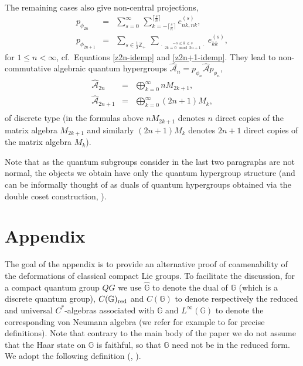\documentclass[12pt]{amsart}
\theoremstyle{definition}
\theoremstyle{remark}
\numberwithin{equation}{section}
\begin{document}
The remaining cases also give non-central projections,
\begin{eqnarray*}
p_{\phi_{2n}} &=& \sum_{s=0}^\infty
\,\sum_{k=-\lceil\frac{s}{n}\rceil}^{\lceil\frac{s}{n}\rceil} e^{(s)}_{nk,nk},\\
p_{\phi_{2n+1}} &=&
\sum_{s\in\frac{1}{2}\mathbb{Z}_+}\,\sum_{\genfrac{.}{.}{0pt}{}{-s\le k \le
    s}{2k\equiv 0\!\!\!\!\mod 2n+1}} e^{(s)}_{kk},
\end{eqnarray*}
for $1\le n<\infty$, cf.\ Equations \eqref{z2n-idemp} and \eqref{z2n+1-idemp}. They lead to non-commutative algebraic
quantum hypergroups $\hat{\mathcal{A}}_{n}=p_{\phi_n}\hat{\mathcal{A}}p_{\phi_n}$,
\begin{eqnarray*}
\hat{\mathcal{A}}_{2n} &=& \bigoplus_{k=0}^\infty  n M_{2k+1}, \\
\hat{\mathcal{A}}_{2n+1} &=& \bigoplus_{k=0}^\infty (2n+1) M_k, \\
\end{eqnarray*}
of discrete type (in the formulas above $nM_{2k+1}$ denotes $n$ direct copies of the matrix algebra $M_{2k+1}$ and similarly
$(2n+1)M_k$ denotes $2n+1$ direct copies of the matrix algebra $M_{k}$).

Note that as the quantum subgroups consider in the last two paragraphs are not normal, the objects we obtain have only the
quantum hypergroup structure (and can be informally thought of as duals of quantum hypergroups obtained via the double coset
construction, \cite{chapovsky+vainerman99}).

\setcounter{section}{0}

\section*{Appendix}

\setcounter{section}{1} \setcounter{theorem}{0}

The goal of the appendix is to provide an alternative proof of coamenability of the deformations of classical 
compact Lie groups. To facilitate the discussion, for a compact quantum group $QG$ we use $\widehat{\mathbb G}$ 
to denote the dual of $\mathbb{G}$ (which is a discrete quantum group), $C(\mathbb{G})_{\rm red}$ and 
$C(\mathbb{G})$ to denote respectively the reduced and universal $C^*$-algebras associated with $\mathbb{G}$ and 
$L^{\infty}(\mathbb{G})$ to denote the corresponding von Neumann algebra (we refer for example to 
\cite{tomatsu07} for precise definitions).  Note that contrary to the main body of the paper we do not assume 
that the Haar state on $\mathbb{G}$ is faithful, so that $\mathbb{G}$ need not be in the reduced form. We adopt 
the following definition (\cite{bedos+murphy+tuset02}, \cite{tomatsu06}).
\end{document}
